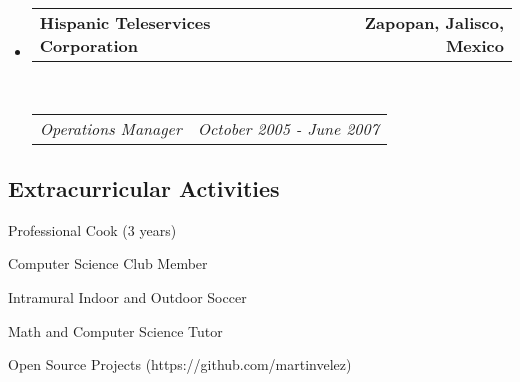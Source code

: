 \documentclass[10pt,letterpaper]{article}
\makeatletter
\newcommand{\headerrow}[2]
{\begin{tabular*}{\linewidth}{l@{\extracolsep{\fill}}r}
	#1 &
	#2 \\
\end{tabular*}}
\makeatother
\begin{document}
\begin{itemize}
	\item
	\headerrow
		{\textbf{Hispanic Teleservices Corporation}}
		{\textbf{Zapopan, Jalisco, Mexico}}
	\\
	\headerrow
		{\emph{Operations Manager}}
		{\emph{October 2005 - June 2007}}

\end{itemize}

\vspace{-0.4em}
\subsection*{Extracurricular Activities}

\begin{itemize*}
	\item Professional Cook (3 years)
	\item Computer Science Club Member
	\item Intramural Indoor and Outdoor Soccer
	\item Math and Computer Science Tutor 
	\item Open Source Projects (https://github.com/martinvelez)
\end{itemize*}
\end{document}
